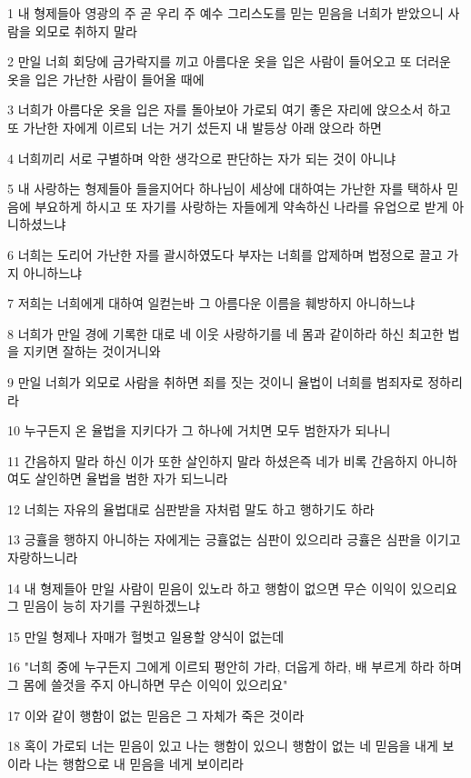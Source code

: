 \par 1 내 형제들아 영광의 주 곧 우리 주 예수 그리스도를 믿는 믿음을 너희가 받았으니 사람을 외모로 취하지 말라
\par 2 만일 너희 회당에 금가락지를 끼고 아름다운 옷을 입은 사람이 들어오고 또 더러운 옷을 입은 가난한 사람이 들어올 때에
\par 3 너희가 아름다운 옷을 입은 자를 돌아보아 가로되 여기 좋은 자리에 앉으소서 하고 또 가난한 자에게 이르되 너는 거기 섰든지 내 발등상 아래 앉으라 하면
\par 4 너희끼리 서로 구별하며 악한 생각으로 판단하는 자가 되는 것이 아니냐
\par 5 내 사랑하는 형제들아 들을지어다 하나님이 세상에 대하여는 가난한 자를 택하사 믿음에 부요하게 하시고 또 자기를 사랑하는 자들에게 약속하신 나라를 유업으로 받게 아니하셨느냐
\par 6 너희는 도리어 가난한 자를 괄시하였도다 부자는 너희를 압제하며 법정으로 끌고 가지 아니하느냐
\par 7 저희는 너희에게 대하여 일컫는바 그 아름다운 이름을 훼방하지 아니하느냐
\par 8 너희가 만일 경에 기록한 대로 네 이웃 사랑하기를 네 몸과 같이하라 하신 최고한 법을 지키면 잘하는 것이거니와
\par 9 만일 너희가 외모로 사람을 취하면 죄를 짓는 것이니 율법이 너희를 범죄자로 정하리라
\par 10 누구든지 온 율법을 지키다가 그 하나에 거치면 모두 범한자가 되나니
\par 11 간음하지 말라 하신 이가 또한 살인하지 말라 하셨은즉 네가 비록 간음하지 아니하여도 살인하면 율법을 범한 자가 되느니라
\par 12 너희는 자유의 율법대로 심판받을 자처럼 말도 하고 행하기도 하라
\par 13 긍휼을 행하지 아니하는 자에게는 긍휼없는 심판이 있으리라 긍휼은 심판을 이기고 자랑하느니라
\par 14 내 형제들아 만일 사람이 믿음이 있노라 하고 행함이 없으면 무슨 이익이 있으리요 그 믿음이 능히 자기를 구원하겠느냐
\par 15 만일 형제나 자매가 헐벗고 일용할 양식이 없는데
\par 16 "너희 중에 누구든지 그에게 이르되 평안히 가라, 더웁게 하라, 배 부르게 하라 하며 그 몸에 쓸것을 주지 아니하면 무슨 이익이 있으리요"
\par 17 이와 같이 행함이 없는 믿음은 그 자체가 죽은 것이라
\par 18 혹이 가로되 너는 믿음이 있고 나는 행함이 있으니 행함이 없는 네 믿음을 내게 보이라 나는 행함으로 내 믿음을 네게 보이리라
